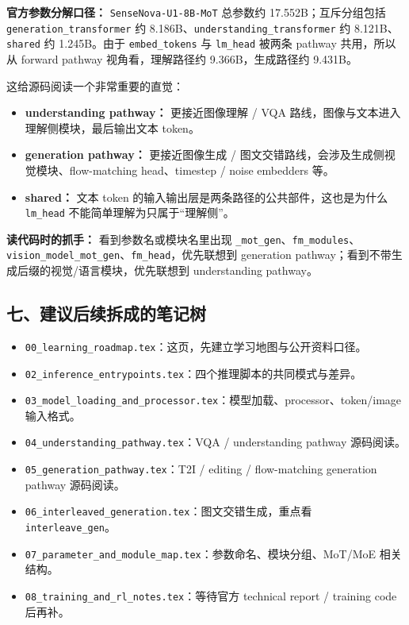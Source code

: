 \begin{summarybox}
\textbf{官方参数分解口径：} \texttt{SenseNova-U1-8B-MoT} 总参数约 17.552B；互斥分组包括 \texttt{generation\_transformer} 约 8.186B、\texttt{understanding\_transformer} 约 8.121B、\texttt{shared} 约 1.245B。由于 \texttt{embed\_tokens} 与 \texttt{lm\_head} 被两条 pathway 共用，所以从 forward pathway 视角看，理解路径约 9.366B，生成路径约 9.431B。
\end{summarybox}

这给源码阅读一个非常重要的直觉：
\begin{itemize}[leftmargin=1.5em]
  \item \textbf{understanding pathway：} 更接近图像理解 / VQA 路线，图像与文本进入理解侧模块，最后输出文本 token。
  \item \textbf{generation pathway：} 更接近图像生成 / 图文交错路线，会涉及生成侧视觉模块、flow-matching head、timestep / noise embedders 等。
  \item \textbf{shared：} 文本 token 的输入输出层是两条路径的公共部件，这也是为什么 \texttt{lm\_head} 不能简单理解为只属于“理解侧”。
\end{itemize}

\begin{intubox}
\textbf{读代码时的抓手：} 看到参数名或模块名里出现 \texttt{\_mot\_gen}、\texttt{fm\_modules}、\texttt{vision\_model\_mot\_gen}、\texttt{fm\_head}，优先联想到 generation pathway；看到不带生成后缀的视觉/语言模块，优先联想到 understanding pathway。
\end{intubox}

\subsection{七、建议后续拆成的笔记树}

\begin{itemize}[leftmargin=1.5em]
  \item \texttt{00\_learning\_roadmap.tex}：这页，先建立学习地图与公开资料口径。
  \item \texttt{02\_inference\_entrypoints.tex}：四个推理脚本的共同模式与差异。
  \item \texttt{03\_model\_loading\_and\_processor.tex}：模型加载、processor、token/image 输入格式。
  \item \texttt{04\_understanding\_pathway.tex}：VQA / understanding pathway 源码阅读。
  \item \texttt{05\_generation\_pathway.tex}：T2I / editing / flow-matching generation pathway 源码阅读。
  \item \texttt{06\_interleaved\_generation.tex}：图文交错生成，重点看 \texttt{interleave\_gen}。
  \item \texttt{07\_parameter\_and\_module\_map.tex}：参数命名、模块分组、MoT/MoE 相关结构。
  \item \texttt{08\_training\_and\_rl\_notes.tex}：等待官方 technical report / training code 后再补。
\end{itemize}


